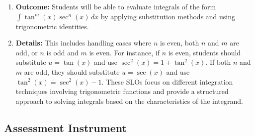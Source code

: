 \begin{enumerate}
    \item \textbf{Outcome:} Students will be able to evaluate integrals of the form $\int \tan^m(x) \sec^n(x) \, dx$ by applying substitution methods and using trigonometric identities.
    \item \textbf{Details:} This includes handling cases where $n$ is even, both $n$ and $m$ are odd, or $n$ is odd and $m$ is even. For instance, if $n$ is even, students should substitute $u = \tan(x)$ and use $\sec^2(x) = 1 + \tan^2(x)$. If both $n$ and $m$ are odd, they should substitute $u = \sec(x)$ and use $\tan^2(x) = \sec^2(x) - 1$. These SLOs focus on different integration techniques involving trigonometric functions and provide a structured approach to solving integrals based on the characteristics of the integrand.
\end{enumerate}

\subsection{Assessment Instrument}

